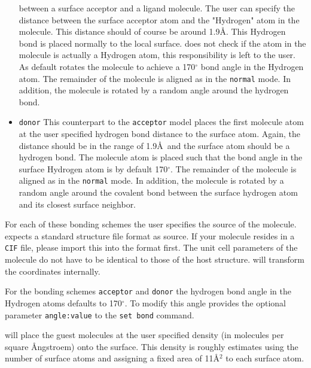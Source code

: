 \begin{itemize}
      between a surface acceptor and a ligand molecule. 
      The user can specify the distance between the 
      surface acceptor atom and the "Hydrogen" atom in the molecule.
      This distance should of course be around 1.9\AA. This
      Hydrogen bond is placed normally to the local surface. \Discus 
      does not check if the atom in the molecule is actually a 
      Hydrogen atom, this responsibility is left to the user.
      As default \Discus rotates the molecule to achieve a 170$^\circ$
      bond angle in the Hydrogen atom.
      The remainder of the molecule is 
      aligned as in the {\tt normal} mode. In addition, the molecule
      is rotated by a random angle around the hydrogen bond.
\item {\tt donor} This counterpart to the {\tt acceptor} model 
      places the first molecule atom at the user specified hydrogen
      bond distance to the surface atom. Again, the distance should 
      be in the range of 1.9\AA\  and the surface atom should be a 
      hydrogen bond. The molecule atom is placed such that the 
      bond angle in the surface Hydrogen atom is by default
      170$^\circ$.
      The remainder of the molecule is 
      aligned as in the {\tt normal} mode. In addition, the molecule
      is rotated by a random angle around the covalent bond between 
      the surface hydrogen atom and its closest surface neighbor.
\end{itemize}

For each of these bonding schemes the user specifies the source of
the molecule. \Discus expects a standard structure file format as 
source. If your molecule resides in a {\tt CIF} file, please 
import this into the \Discus format first. The unit cell parameters
of the molecule do not have to be identical to those of the host
structure. \Discus will transform the coordinates internally.

For the bonding schemes {\tt acceptor} and {\tt donor} the 
hydrogen bond angle in the Hydrogen atoms defaults to 170$^\circ$.
To modify this angle \Discus provides the optional parameter
{\tt angle:value} to the {\tt set bond} command. 

\Discus will place the guest molecules at the user specified density 
(in molecules per square \AA ngstroem) onto the surface. This density
is roughly estimates using the number of surface atoms and assigning a
fixed area of 11\AA$^2$ to each surface atom. 

